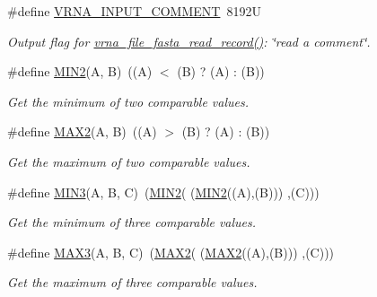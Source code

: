 \begin{DoxyCompactItemize}
\#define \hyperlink{group__utils_gaf2062e0eeefffd3ed639af460b3d4fab}{V\+R\+N\+A\+\_\+\+I\+N\+P\+U\+T\+\_\+\+C\+O\+M\+M\+E\+NT}~8192U
\begin{DoxyCompactList}\small\item\em Output flag for \hyperlink{group__file__utils_ga8cfb7e271efc9e1f34640acb85475639}{vrna\+\_\+file\+\_\+fasta\+\_\+read\+\_\+record()}\+: {\itshape \char`\"{}read a comment\char`\"{}}. \end{DoxyCompactList}\item 
\mbox{\label{group__utils_gae0b9cd0ce090bd69b951aa73e8fa4f7d}} 
\#define \hyperlink{group__utils_gae0b9cd0ce090bd69b951aa73e8fa4f7d}{M\+I\+N2}(A,  B)~((A) $<$ (B) ? (A) \+: (B))
\begin{DoxyCompactList}\small\item\em Get the minimum of two comparable values. \end{DoxyCompactList}\item 
\mbox{\label{group__utils_ga33297b3679c713b0c4d897cd0fe3b122}} 
\#define \hyperlink{group__utils_ga33297b3679c713b0c4d897cd0fe3b122}{M\+A\+X2}(A,  B)~((A) $>$ (B) ? (A) \+: (B))
\begin{DoxyCompactList}\small\item\em Get the maximum of two comparable values. \end{DoxyCompactList}\item 
\mbox{\label{group__utils_ga721b8d5f3abef17f10293f1f7f8c958e}} 
\#define \hyperlink{group__utils_ga721b8d5f3abef17f10293f1f7f8c958e}{M\+I\+N3}(A,  B,  C)~(\hyperlink{group__utils_gae0b9cd0ce090bd69b951aa73e8fa4f7d}{M\+I\+N2}(  (\hyperlink{group__utils_gae0b9cd0ce090bd69b951aa73e8fa4f7d}{M\+I\+N2}((A),(B))) ,(C)))
\begin{DoxyCompactList}\small\item\em Get the minimum of three comparable values. \end{DoxyCompactList}\item 
\mbox{\label{group__utils_ga8d577123d2e66d2b7d0bf9af6e172b93}} 
\#define \hyperlink{group__utils_ga8d577123d2e66d2b7d0bf9af6e172b93}{M\+A\+X3}(A,  B,  C)~(\hyperlink{group__utils_ga33297b3679c713b0c4d897cd0fe3b122}{M\+A\+X2}(  (\hyperlink{group__utils_ga33297b3679c713b0c4d897cd0fe3b122}{M\+A\+X2}((A),(B))) ,(C)))
\begin{DoxyCompactList}\small\item\em Get the maximum of three comparable values. \end{DoxyCompactList}\end{DoxyCompactItemize}
